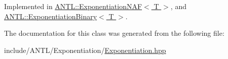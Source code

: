 Implemented in \hyperlink{classANTL_1_1ExponentiationNAF_ae8d97318323ee8b3a888080d75f2cc39}{A\-N\-T\-L\-::\-Exponentiation\-N\-A\-F$<$ T $>$}, and \hyperlink{classANTL_1_1ExponentiationBinary_a039ea9d52144229d0728d81060d43fc4}{A\-N\-T\-L\-::\-Exponentiation\-Binary$<$ T $>$}.



The documentation for this class was generated from the following file\-:\begin{DoxyCompactItemize}
\item 
include/\-A\-N\-T\-L/\-Exponentiation/\hyperlink{Exponentiation_8hpp}{Exponentiation.\-hpp}\end{DoxyCompactItemize}
